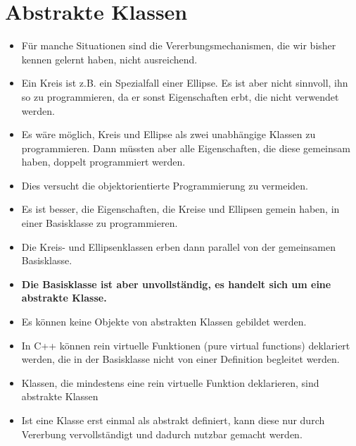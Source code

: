 \section{Abstrakte Klassen}
\begin{itemize}
	\item Für manche Situationen sind die Vererbungsmechanismen, die wir bisher kennen gelernt haben, nicht ausreichend.
	\item Ein Kreis ist z.B. ein Spezialfall einer Ellipse. Es ist aber nicht sinnvoll, ihn so zu programmieren, da er sonst Eigenschaften erbt, die nicht verwendet werden.
	\item Es wäre möglich, Kreis und Ellipse als zwei unabhängige Klassen zu programmieren. Dann müssten aber alle Eigenschaften, die diese gemeinsam haben, doppelt programmiert werden.
	\item Dies versucht die objektorientierte Programmierung zu vermeiden.
	\item Es ist besser, die Eigenschaften, die Kreise und Ellipsen gemein haben, in einer Basisklasse zu programmieren.
	\item Die Kreis- und Ellipsenklassen erben dann parallel von der gemeinsamen Basisklasse.
	\item \textbf{Die Basisklasse ist aber unvollständig, es handelt sich um eine abstrakte Klasse.}
	\item Es können keine Objekte von abstrakten Klassen gebildet werden.
	\item In C++ können rein virtuelle Funktionen (pure virtual functions) deklariert werden, die in der Basisklasse nicht von einer Definition begleitet werden.
	\item Klassen, die mindestens eine rein virtuelle Funktion deklarieren, sind abstrakte Klassen
	\item Ist eine Klasse erst einmal als abstrakt definiert, kann diese nur durch Vererbung vervollständigt und dadurch nutzbar gemacht werden.
\end{itemize}

